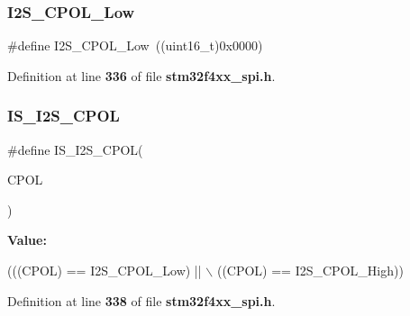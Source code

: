 \subsubsection{I2\+S\+\_\+\+C\+P\+O\+L\+\_\+\+Low}
{\footnotesize\ttfamily \#define I2\+S\+\_\+\+C\+P\+O\+L\+\_\+\+Low~((uint16\+\_\+t)0x0000)}



Definition at line \textbf{ 336} of file \textbf{ stm32f4xx\+\_\+spi.\+h}.

\mbox{\label{group__SPI__I2S__Clock__Polarity_ga6323375bf0b6fa6e2ee2a9ce6f9ef82f}} 
\subsubsection{I\+S\+\_\+\+I2\+S\+\_\+\+C\+P\+OL}
{\footnotesize\ttfamily \#define I\+S\+\_\+\+I2\+S\+\_\+\+C\+P\+OL(\begin{DoxyParamCaption}\item[{}]{C\+P\+OL }\end{DoxyParamCaption})}

{\bfseries Value\+:}
\begin{DoxyCode}
(((CPOL) == I2S_CPOL_Low) || \(\backslash\)
                           ((CPOL) == I2S_CPOL_High))
\end{DoxyCode}


Definition at line \textbf{ 338} of file \textbf{ stm32f4xx\+\_\+spi.\+h}.

